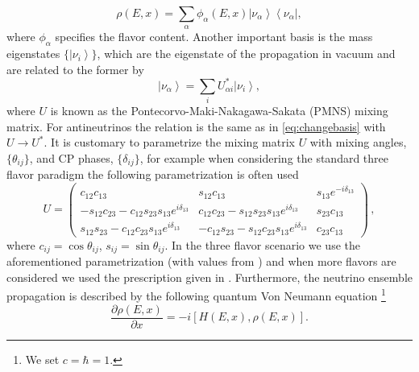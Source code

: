 \documentclass[3p,12pt]{elsarticle}
\newcommand{\bra}[1]{\ensuremath{\left\langle#1\right|}}
\newcommand{\ket}[1]{\ensuremath{\left|#1\right\rangle}}
\newcommand{\pa}[2]{\frac{\partial #1}{\partial #2}}
\begin{document}
\begin{equation}
\rho(E,x) = \sum_\alpha \phi_\alpha(E,x) \ket{\nu_\alpha}\bra{\nu_\alpha} , 
\label{eq:state}
\end{equation}
where $\phi_\alpha$ specifies the flavor content. Another important
basis is the mass eigenstates $\{ \ket{\nu_i}  \}$, which are the
eigenstate of the propagation in vacuum and are related to the former by
\begin{equation}
\ket{\nu_\alpha} = \sum_i U^*_{\alpha i} \ket{\nu_i} ,
\label{eq:changebasis}
\end{equation}
where $U$ is known as the Pontecorvo-Maki-Nakagawa-Sakata (PMNS)
mixing matrix. For antineutrinos the relation is the same as in
\eqref{eq:changebasis} with $U \to U^*$.
It is customary to parametrize the mixing matrix $U$
with mixing angles, $\{\theta_{ij}\}$, and CP phases, $\{ \delta_{ij}
\}$, for example when considering the standard three flavor paradigm
the following parametrization is often used
\begin{equation}
U
=
\begin{pmatrix}
c_{12} c_{13} & s_{12} c_{13} & s_{13} e^{-i\delta_{13}} \\ 
- s_{12} c_{23} - c_{12} s_{23} s_{13} e^{i\delta_{13}} & c_{12} c_{23} - s_{12} s_{23} s_{13} e^{i\delta_{13}} & s_{23} c_{13} \\
s_{12}s_{23} -c_{12}c_{23}s_{13}e^{i\delta_{13}} & - c_{12} s_{23} - s_{12} c_{23} s_{13} e^{i\delta_{13}} & c_{23} c_{13}
\end{pmatrix}
\,,
\label{eq:U}
\end{equation}
where $c_{ij} = \cos \theta_{ij}$, $s_{ij} = \sin \theta_{ij}$. In the
three flavor scenario we use the aforementioned parametrization (with
values from \citep{Gonzalez-Garcia:2014bfa}) and when more flavors are
considered we used the prescription given in
\cite{SQUIDS}. Furthermore, the neutrino ensemble propagation is
described by the following quantum Von Neumann equation \footnote{We set $c = \hbar = 1$.} 
\begin{equation}
\pa{\rho(E,x)}{x} = -i [ H (E,x), \rho(E,x) ].
\label{eq:schrodinger}
\end{equation}
\end{document}
